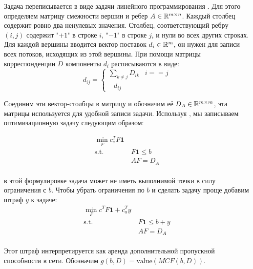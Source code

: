 Задача переписывается в виде задачи линейного программирования \cite{bazaraa2011linear}. Для этого определяем матрицу смежности вершин и ребер $A \in {\mathbb R}^{m\times n}$. Каждый столбец содержит ровно два ненулевых значения. Столбец, соответствующий ребру $(i, j)$ содержит "$+1$" в строке  $i$, "$-1$" в строке $j$, и нули во всех других строках. Для каждой вершины вводится вектор поставок  $d_i \in {\mathbb R}^m$, он нужен для записи всех потоков, исходящих из этой вершины. При помощи матрицы корреспонденции $D$ компоненты $d_i$ расписываются в виде:
\begin{equation*}
d_{ij} = 
\begin{cases}
    \sum_{k \neq j} D_{ik} & i == j \\
    -d_{ij}
\end{cases}
\end{equation*}

Соединим эти вектор-столбцы в матрицу и обозначим её $D_A \in {\mathbb R}^{m\times m}$, эта матрицы используется для удобной записи задачи. 
Используя \cite{bazaraa2011linear}, мы записываем оптимизационную задачу следующим образом:

\begin{align*}
    \min_{F} c_e^T F \textbf{1} & \\
    \text{s.t.} & ~ F\textbf{1} \leq b \\
                & ~ AF = D_A\\
\end{align*}

в этой формулировке задача может не иметь выполнимой точки в силу ограничения с  $b$. Чтобы убрать ограничения по $b$ и сделать задачу проще добавим штраф $y$ к задаче:
\begin{align*}
    \min_{F} c^T F \textbf{1} + c_a^T y & \tag{$MCF$}\label{opt:MCF}\\
    \text{s.t.} & ~ F\textbf{1} \leq b + y\\
                & ~ AF = D_A\\
\end{align*}

Этот штраф интерпретируется как аренда дополнительной пропускной способности в сети. Обозначим $g(b, D) = \text{value}(MCF(b, D))$.

